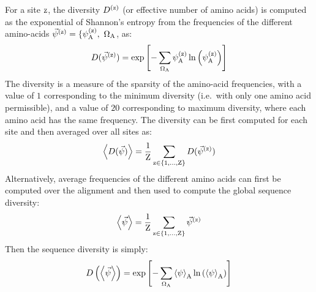 For a site $\text{z}$, the diversity $D^{(\text{z})}$ (or effective number of amino acids) is computed as the exponential of Shannon's entropy from the frequencies of the different amino-acids $\Freq\siteexp = \{ \freq\siteexp_{\aminoacid},\ \SetAa$, as:
\begin{equation}
    D(\vec{\psi}^{(\text{z})}) = \exp \left[ - \sum\limits_{\Omega_{\text{A}}} \psi^{(\text{z})}_{\text{A}} \ln \left( \psi^{(\text{z})}_{\text{A}} \right) \right]
    \label{eq:diversity-site-specific}
\end{equation}
The diversity is a measure of the sparsity of the amino-acid frequencies, with a value of $1$ corresponding to the minimum diversity (i.e.~with only one amino acid permissible), and a value of $20$ corresponding to maximum diversity, where each amino acid has the same frequency.
The diversity can be first computed for each site and then averaged over all sites as:
\begin{equation}
    \left\langle D(\vec{\psi}) \right\rangle = \dfrac{1}{\text{Z}}\sum\limits_{\text{z} \in \{1, \hdots, \text{Z}\}} D(\vec{\psi}^{(\text{z})})
    \label{eq:diversity-site-specific-avg}
\end{equation}
Alternatively, average frequencies of the different amino acids can first be computed over the alignment and then used to compute the global sequence diversity:
\begin{equation}
    \left\langle \vec{\psi} \right\rangle = \dfrac{1}{\text{Z}}\sum\limits_{\text{z} \in \{1, \hdots, \text{Z}\}} \vec{\psi}^{(\text{z})}
    \label{eq:profile-gene-wise}
\end{equation}
Then the sequence diversity is simply:
\begin{equation}
    D \left(  \left\langle \vec{\psi} \right\rangle \right) = \exp \left[ - \sum\limits_{\Omega_{\text{A}}} \left\langle \psi \right\rangle_{\text{A}} \ln \left( \left\langle \psi \right\rangle_{\text{A}} \right) \right]
    \label{eq:diversity-gene-wise}
\end{equation}

